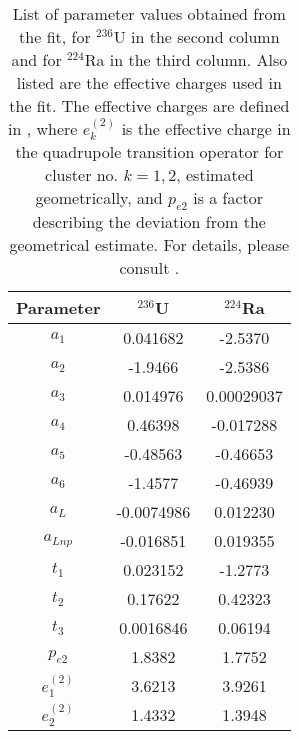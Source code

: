 \documentclass[12pt]{article}
\begin{document}
\begin{center}
\begin{table}[h!]
\centering
\begin{tabular}{|c|c|c|}
\hline\hline
Parameter & $^{236}$U & $^{224}$Ra \\
\hline
$a_1$ & 0.041682 & -2.5370 \\
$a_2$ & -1.9466 & -2.5386 \\
$a_3$ & 0.014976 & 0.00029037 \\
$a_4$ & 0.46398 & -0.017288 \\
$a_5$ & -0.48563 & -0.46653\\
$a_6$ & -1.4577 & -0.46939 \\
$a_L$ & -0.0074986 & 0.012230\\
$a_{Lnp}$ & -0.016851 & 0.019355\\
$t_1$ & 0.023152 & -1.2773 \\
$t_2$ & 0.17622 & 0.42323\\
$t_3$ & 0.0016846 & 0.06194 \\
$p_{e2}$ & 1.8382 & 1.7752 \\
$e^{(2)}_{1}$ & 3.6213 & 3.9261\\
$e^{(2)}_{2}$ & 1.4332 & 1.3948 \\
\hline 
 \end{tabular}
\caption{
List of parameter values obtained from the fit, for $^{236}$U in the second column and
for $^{224}$Ra in the third column. Also listed are the effective charges used in the fit.
The effective charges are defined in \cite{hess-86}, where
$e^{(2)}_{k}$ is the effective charge in the quadrupole transition operator for 
cluster no. $k=1,2$, estimated geometrically, and $p_{e2}$ is a factor describing
the deviation from the geometrical estimate. For details, please consult \cite{hess-86}. 
} 
\vspace{0.2cm}
\label{para-U-Ra}
\end{table}
\end{center}
\end{document}
